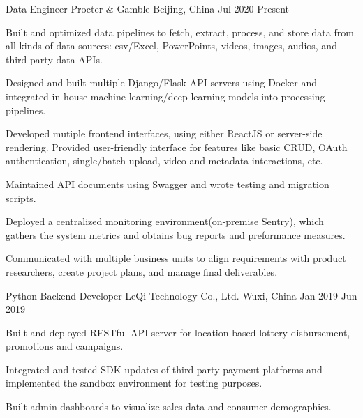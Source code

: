 

\begin{cventries}

  \cventry
    {Data Engineer} %
    {Procter \& Gamble} %
    {Beijing, China} %
    {Jul 2020 \textemdash Present} %
    {
      \begin{cvitems} %
        \item {Built and optimized data pipelines to fetch, extract, process, and store data from all kinds of data sources: csv/Excel, PowerPoints, videos, images, audios, and third-party data APIs.}
        \item {Designed and built multiple Django/Flask API servers using Docker and integrated in-house machine learning/deep learning models into processing pipelines.}
        \item {Developed mutiple frontend interfaces, using either ReactJS or server-side rendering. Provided user-friendly interface for features like basic CRUD, OAuth authentication, single/batch upload, video and metadata interactions, etc.}
        \item {Maintained API documents using Swagger and wrote testing and migration scripts.}
        \item {Deployed a centralized monitoring environment(on-premise Sentry), which gathers the system metrics and obtains bug reports and preformance measures.}
        \item {Communicated with multiple business units to align requirements with product researchers, create project plans, and manage final deliverables.}
      \end{cvitems}
    }

  \cventry
    {Python Backend Developer} %
    {LeQi Technology Co., Ltd.} %
    {Wuxi, China} %
    {Jan 2019 \textemdash Jun 2019} %
    {
      \begin{cvitems} %
        \item {Built and deployed RESTful API server for location-based lottery disbursement, promotions and campaigns.}
        \item {Integrated and tested SDK updates of third-party payment platforms and implemented the sandbox environment for testing purposes.}
        \item {Built admin dashboards to visualize sales data and consumer demographics.}
      \end{cvitems}
    }


\end{cventries}
